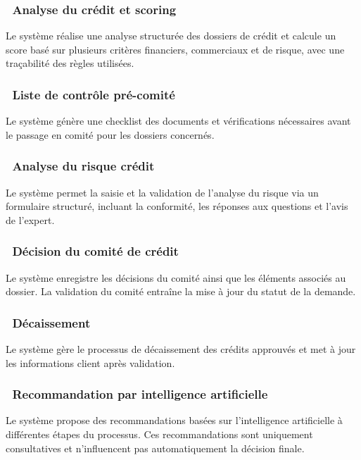 \subsubsection*{~Analyse du crédit et scoring}

Le système réalise une analyse structurée des dossiers de crédit et calcule un score basé
sur plusieurs critères financiers, commerciaux et de risque, avec une traçabilité des règles
utilisées.

\subsubsection*{~Liste de contrôle pré-comité}

Le système génère une checklist des documents et vérifications nécessaires avant le passage
en comité pour les dossiers concernés.

\subsubsection*{~Analyse du risque crédit}

Le système permet la saisie et la validation de l'analyse du risque via un formulaire
structuré, incluant la conformité, les réponses aux questions et l'avis de l'expert.

\subsubsection*{~Décision du comité de crédit}

Le système enregistre les décisions du comité ainsi que les éléments associés au dossier.
La validation du comité entraîne la mise à jour du statut de la demande.

\subsubsection*{~Décaissement}

Le système gère le processus de décaissement des crédits approuvés et met à jour les
informations client après validation.

\subsubsection*{~Recommandation par intelligence artificielle}

Le système propose des recommandations basées sur l'intelligence artificielle à différentes
étapes du processus. Ces recommandations sont uniquement consultatives et n'influencent pas
automatiquement la décision finale.

